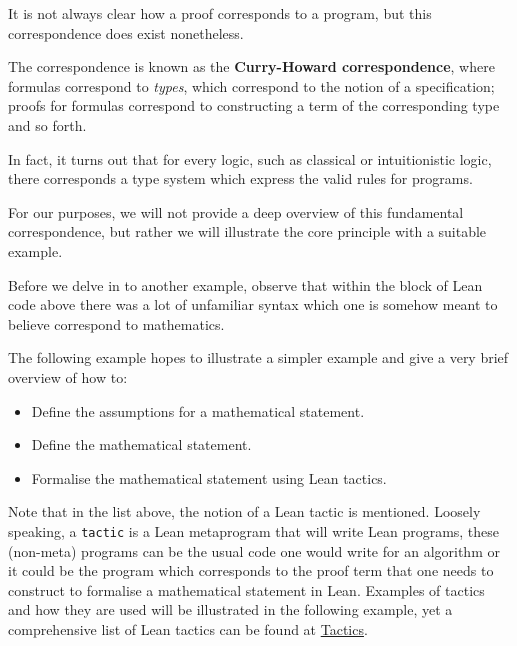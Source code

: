 It is not always clear how a proof corresponds to a program, but this correspondence does exist nonetheless.

The correspondence is known as the \textbf{Curry-Howard correspondence}, where formulas correspond to \textit{types}, which correspond to the notion of a specification;
proofs for formulas correspond to constructing a term of the corresponding type and so forth. 

In fact, it turns out that for every logic, such as classical or intuitionistic logic, there corresponds a type system which express the valid rules for programs. 

For our purposes, we will not provide a deep overview of this fundamental correspondence, but rather we will illustrate the core principle with a suitable example.

Before we delve in to another example, observe that within the block of Lean code above there was a lot of unfamiliar syntax which one is somehow meant to believe correspond to mathematics. 

The following example hopes to illustrate a simpler example and give a very brief overview of how to:

\begin{itemize}
    \item Define the assumptions for a mathematical statement.
    \item Define the mathematical statement.
    \item Formalise the mathematical statement using Lean tactics.
\end{itemize}

Note that in the list above, the notion of a Lean tactic is mentioned. Loosely speaking, a \texttt{tactic} is a Lean metaprogram that will write Lean programs, these (non-meta) programs can
be the usual code one would write for an algorithm or it could be the program which corresponds to the proof term that one needs to construct to formalise
a mathematical statement in Lean. Examples of tactics and how they are used will be illustrated in the following example, yet a comprehensive list of Lean tactics can be found at \href{https://lean-lang.org/doc/reference/latest//Tactic-Proofs/Tactic-Reference/}{Tactics}.

